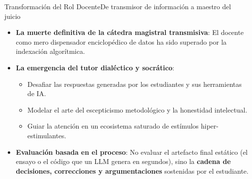 \documentclass[aspectratio=169,11pt]{beamer}
\begin{document}
\begin{frame}{Transformación del Rol Docente}{De transmisor de
  información a maestro del juicio}
\begin{itemize}\setlength{\itemsep}{0.6em}
    \item \textbf{La muerte definitiva de la cátedra magistral
      transmisiva}: El docente como mero dispensador enciclopédico
      de datos ha sido superado por la indexación algorítmica.
    \item \textbf{La emergencia del tutor dialéctico y socrático}:
    \begin{itemize}\setlength{\itemsep}{0.3em}
        \item Desafiar las respuestas generadas por los estudiantes
          y sus herramientas de IA.
        \item Modelar el arte del escepticismo metodológico y la
          honestidad intelectual.
        \item Guiar la atención en un ecosistema saturado de
          estímulos hiper-estimulantes.
      \end{itemize}
    \item \textbf{Evaluación basada en el proceso}: No evaluar el
      artefacto final estático (el ensayo o el código que un LLM
      genera en segundos), sino la \textbf{cadena de decisiones,
      correcciones y argumentaciones} sostenidas por el estudiante.
  \end{itemize}
\end{frame}
\end{document}
